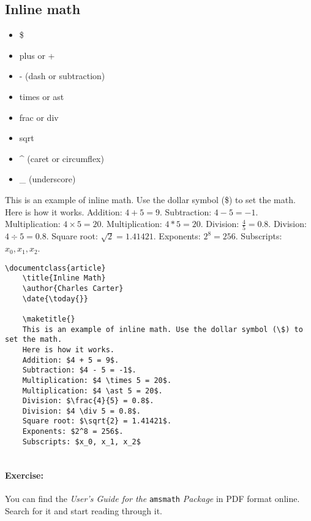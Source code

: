         \subsection{Inline math}
        \label{Inline-math}
        
        \begin{framed}
            \begin{itemize}
                \item{\$}
                \item{plus or +}
				\item{- (dash or subtraction)}
                \item{times or ast}
                \item{frac or div}
                \item{sqrt}
				\item{\^{} (caret or circumflex)}
				\item{\_ (underscore)} 
            \end{itemize}
        \end{framed}

	This is an example of inline math. Use the dollar symbol (\$) to set the math. Here is how it works.  Addition: $4 + 5 = 9$.  Subtraction: $4 - 5 = -1$.  Multiplication: $4 \times 5 = 20$.  Multiplication: $4 \ast 5 = 20$.  Division: $\frac{4}{5} = 0.8$.  Division: $4 \div 5 = 0.8$.  Square root: $\sqrt{2} = 1.41421$.  Exponents: $2^8 = 256$.  Subscripts: $x_0, x_1, x_2$.

        \begin{verbatim}
\documentclass{article}
    \title{Inline Math}
    \author{Charles Carter}
    \date{\today{}}
 
    \maketitle{}
	This is an example of inline math. Use the dollar symbol (\$) to set the math. 
	Here is how it works. 
    Addition: $4 + 5 = 9$. 
    Subtraction: $4 - 5 = -1$. 
    Multiplication: $4 \times 5 = 20$. 
    Multiplication: $4 \ast 5 = 20$.
    Division: $\frac{4}{5} = 0.8$. 
    Division: $4 \div 5 = 0.8$. 
    Square root: $\sqrt{2} = 1.41421$. 
    Exponents: $2^8 = 256$.
	Subscripts: $x_0, x_1, x_2$
	    
		\end{verbatim}

		\paragraph{Exercise:} You can find the \textit{User's Guide for the }\texttt{amsmath} \textit{Package} in PDF format online. Search for it and start reading through it.

